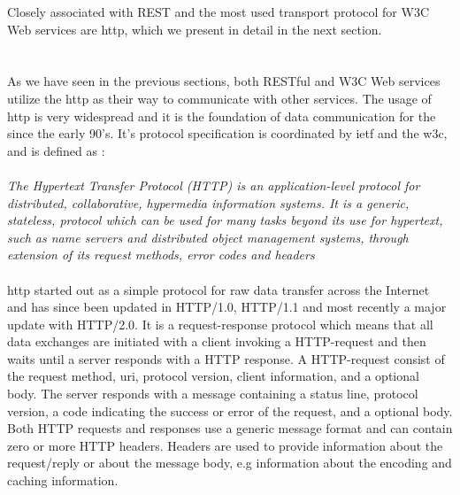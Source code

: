 Closely associated with REST and the most used transport protocol for W3C Web
services are \gls{http}, which we present in detail in the next section.


\section{}

As we have seen in the previous sections, both RESTful and W3C Web services
utilize the \gls{http} as their way to communicate with other services. The
usage of \gls{http} is very widespread and it is the foundation of data
communication for the  since the early 90's. It's protocol
specification is coordinated by \gls{ietf} and the \gls{w3c}, and is defined
as \cite{rfc-2616}:

\paragraph{}
\textit{
    The Hypertext Transfer Protocol (HTTP) is an application-level
    protocol for distributed, collaborative, hypermedia information
    systems. It is a generic, stateless, protocol which can be used for
    many tasks beyond its use for hypertext, such as name servers and
    distributed object management systems, through extension of its
    request methods, error codes and headers
}

\paragraph{}

\gls{http} started out as a simple protocol for raw data transfer across the
Internet and has since been updated in HTTP/1.0, HTTP/1.1 and most recently a
major update with HTTP/2.0. It is a request-response protocol which means that all
data exchanges are initiated with a client invoking a HTTP-request and then
waits until a server responds with a HTTP response. A HTTP-request consist of
the request method, \gls{uri}, protocol version, client information, and a optional
body. The server responds with a message containing a status line, protocol
version, a code indicating the success or error of the request, and a optional
body. Both HTTP requests and responses use a generic message format and can
contain zero or more HTTP headers. Headers are used to provide information about
the request/reply or about the message body, e.g information about the encoding
and caching information.

